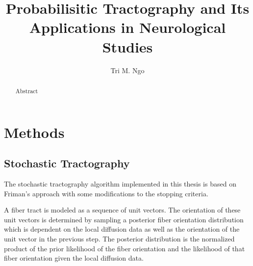\documentclass{article}
\author{Tri M. Ngo}
\title{Probabilisitic Tractography and Its Applications in Neurological Studies}
\begin{document}
\maketitle

\begin{abstract}
Abstract
\end{abstract}

\section{Methods}

  


  

\subsection{Stochastic Tractography}
The stochastic tractography algorithm implemented in this thesis is based on Friman's \cite{frimanTMI06} approach with some modifications to the stopping criteria.

A fiber tract is modeled as a sequence of unit vectors.  The orientation of these unit vectors is determined by sampling a posterior fiber orientation distribution which is dependent on the local diffusion data as well as the orientation of the unit vector in the previous step.  The posterior distribution is the normalized product of the prior likelihood of the fiber orientation and the likelihood of that fiber orientation given the local diffusion data.
\end{document}
